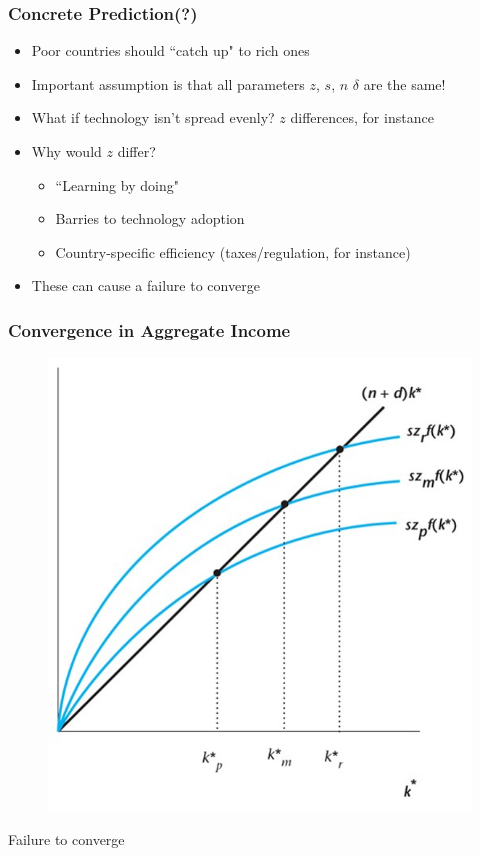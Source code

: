 \documentclass{beamer}
\begin{document}
\begin{frame}
\frametitle[alignment=center]{Concrete Prediction(?)}
\begin{itemize}
\item Poor countries should ``catch up" to rich ones
\bigskip
\item Important assumption is that all parameters $z$, $s$, $n$ $\delta$ are the same!
\bigskip
\item What if technology isn't spread evenly?  $z$ differences, for instance
\bigskip
\item Why would $z$ differ?
\bigskip
\begin{itemize}
\item ``Learning by doing"
\item Barries to technology adoption
\item Country-specific efficiency (taxes/regulation, for instance)
\end{itemize}
\item These can cause a failure to converge
\end{itemize}
\end{frame}

\begin{frame}
\frametitle[alignment=center]{Convergence in Aggregate Income }
\begin{figure}
\centering
\includegraphics[scale=0.5]{Figures/W_Fig_8pt4.png}
\end{figure}
Failure to converge
\end{frame}
\end{document}
